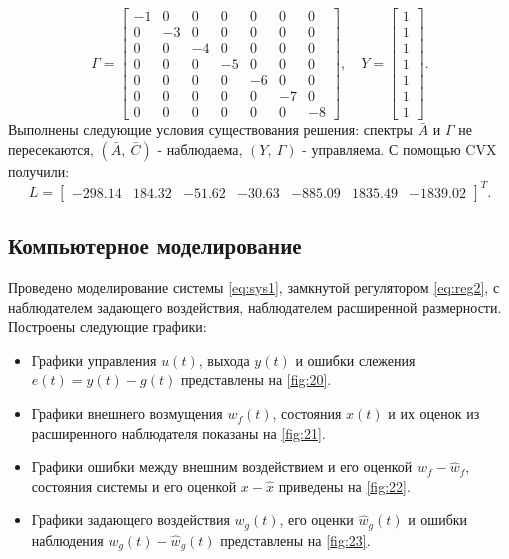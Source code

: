 \begin{equation*}
    \Gamma=\begin{bmatrix}
        -1 & 0 & 0 & 0 & 0 & 0 & 0 \\
        0 & -3 & 0 & 0 & 0 & 0 & 0 \\
        0 & 0 & -4 & 0 & 0 & 0 & 0 \\
        0 & 0 & 0 & -5 & 0 & 0 & 0 \\
        0 & 0 & 0 & 0 & -6 & 0 & 0 \\
        0 & 0 & 0 & 0 & 0 & -7 & 0 \\
        0 & 0 & 0 & 0 & 0 & 0 & -8
    \end{bmatrix},\quad
    Y=\begin{bmatrix}
        1 \\ 1 \\ 1 \\ 1 \\ 1 \\ 1 \\ 1
    \end{bmatrix}.
\end{equation*}
Выполнены следующие условия существования решения: спектры $\bar A$ и $\Gamma$ не пересекаются,
$(\bar A,\ \bar C)$ - наблюдаема, $(Y,\ \Gamma)$ - управляема. С помощью CVX
получили:
\begin{equation*}
    L=\begin{bmatrix}
        -298.14&
        184.32&
        -51.62&
        -30.63&
        -885.09&
        1835.49&
        -1839.02
    \end{bmatrix}^T.
\end{equation*}

\subsection{Компьютерное моделирование}

Проведено моделирование системы \eqref{eq:sys1}, 
замкнутой регулятором \eqref{eq:reg2}, с наблюдателем задающего
воздействия, наблюдателем расширенной размерности. 
Построены следующие графики:
\begin{itemize}
    \item Графики управления $u(t)$, выхода $y(t)$ и ошибки слежения 
    $e(t)=y(t)-g(t)$ представлены на \autoref{fig:20}.
    \item Графики внешнего возмущения $w_f(t)$, состояния $x(t)$ и 
    их оценок из расширенного наблюдателя показаны на \autoref{fig:21}.
    \item Графики ошибки между внешним воздействием и его оценкой $w_f-\hat w_f$, 
    состояния системы и его оценкой $x-\hat x$ приведены на \autoref{fig:22}.
    \item Графики задающего воздействия $w_g(t)$, его оценки $\hat w_g(t)$ и 
    ошибки наблюдения $w_g(t)-\hat w_g(t)$ представлены на \autoref{fig:23}.
\end{itemize}

